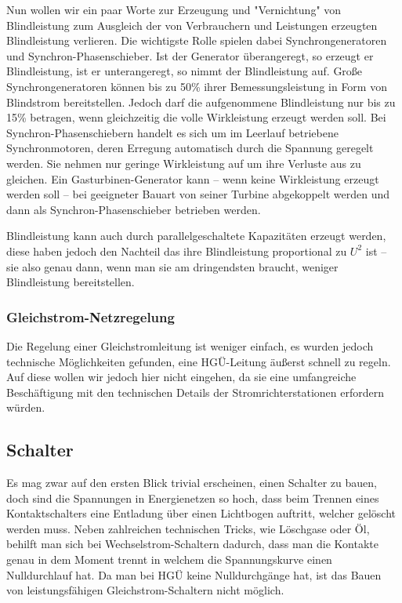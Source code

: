 Nun wollen wir ein paar Worte zur Erzeugung und "Vernichtung" von Blindleistung zum Ausgleich der von Verbrauchern und Leistungen erzeugten Blindleistung verlieren. Die wichtigste Rolle spielen dabei Synchrongeneratoren und Synchron-Phasenschieber.
Ist der Generator überangeregt, %
so erzeugt er Blindleistung, ist er unterangeregt, so nimmt der Blindleistung auf. Große Synchrongeneratoren können bis zu 50\% ihrer Bemessungsleistung in Form von Blindstrom bereitstellen.
Jedoch darf die aufgenommene Blindleistung nur bis zu 15\% betragen, wenn gleichzeitig die volle Wirkleistung erzeugt werden soll.\cite{Harrison}
Bei Synchron-Phasenschiebern handelt es sich um im Leerlauf betriebene Synchronmotoren, deren Erregung automatisch durch die Spannung geregelt werden. Sie nehmen nur geringe Wirkleistung auf um ihre Verluste aus zu gleichen. Ein Gasturbinen-Generator kann – wenn keine Wirkleistung erzeugt werden soll – bei geeigneter Bauart von seiner Turbine abgekoppelt werden und dann als Synchron-Phasenschieber betrieben werden.\cite{Harrison}

Blindleistung kann auch durch parallelgeschaltete Kapazitäten erzeugt werden, diese haben jedoch den Nachteil das ihre Blindleistung proportional zu $U^2$ ist – sie also genau dann, wenn man sie am dringendsten braucht, weniger Blindleistung bereitstellen.\cite{Harrison}

\subsubsection{Gleichstrom-Netzregelung}
Die Regelung einer Gleichstromleitung ist weniger einfach, es wurden jedoch technische Möglichkeiten gefunden, eine HGÜ-Leitung äußerst schnell zu regeln. Auf diese wollen wir jedoch hier nicht eingehen, da sie eine umfangreiche Beschäftigung mit den technischen Details der Stromrichterstationen erfordern würden. %

\subsection{Schalter}
Es mag zwar auf den ersten Blick trivial erscheinen, einen Schalter zu bauen, doch sind die Spannungen in Energienetzen so hoch, dass beim Trennen eines Kontaktschalters eine Entladung über einen Lichtbogen auftritt, welcher gelöscht werden muss.
Neben zahlreichen technischen Tricks, wie Löschgase oder Öl, behilft man sich bei Wechselstrom-Schaltern dadurch,
dass man die Kontakte genau in dem Moment trennt in welchem die Spannungskurve einen Nulldurchlauf hat. %
Da man bei HGÜ keine Nulldurchgänge hat, ist das Bauen von leistungsfähigen Gleichstrom-Schaltern nicht möglich. %


